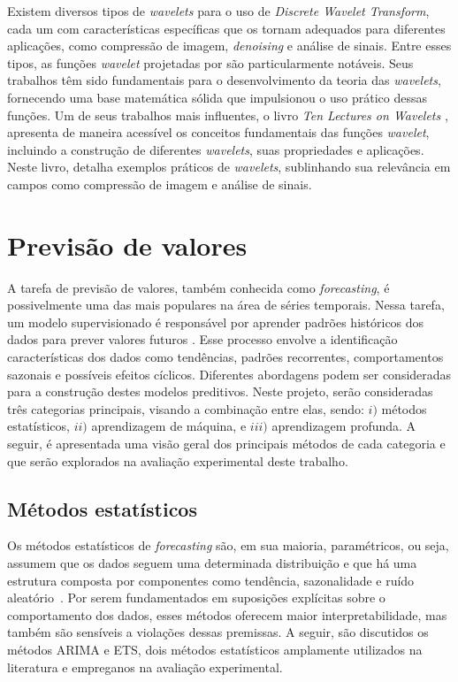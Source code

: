 Existem diversos tipos de \textit{wavelets} para o uso de \textit{Discrete Wavelet Transform}, cada um com características específicas que os tornam adequados para diferentes aplicações, como compressão de imagem, \textit{denoising} e análise de sinais. Entre esses tipos, as funções \textit{wavelet} projetadas por \citeauthor{daubechies1992ten} são particularmente notáveis. Seus trabalhos têm sido fundamentais para o desenvolvimento da teoria das \textit{wavelets}, fornecendo uma base matemática sólida que impulsionou o uso prático dessas funções. Um de seus trabalhos mais influentes, o livro \textit{Ten Lectures on Wavelets} \cite{daubechies1992ten}, apresenta de maneira acessível os conceitos fundamentais das funções \textit{wavelet}, incluindo a construção de diferentes \textit{wavelets}, suas propriedades e aplicações. Neste livro, \citeauthor{daubechies1992ten} detalha exemplos práticos de \textit{wavelets}, sublinhando sua relevância em campos como compressão de imagem e análise de sinais.


\section{Previsão de valores}
A tarefa de previsão de valores, também conhecida como \textit{forecasting}, é possivelmente uma das mais populares na área de séries temporais. Nessa tarefa, um modelo supervisionado é responsável por aprender padrões históricos dos dados para prever valores futuros \citep{parmezan2019evaluation}. Esse processo envolve a identificação características dos dados como tendências, padrões recorrentes, comportamentos sazonais e possíveis efeitos cíclicos. Diferentes abordagens podem ser consideradas para a construção destes modelos preditivos. Neste projeto, serão consideradas três categorias principais, visando a combinação entre elas, sendo: $i)$ métodos estatísticos, $ii)$ aprendizagem de máquina, e $iii)$ aprendizagem profunda. A seguir, é apresentada uma visão geral dos principais métodos de cada categoria e que serão explorados na avaliação experimental deste trabalho.

\subsection{Métodos estatísticos}
Os métodos estatísticos de \textit{forecasting} são, em sua maioria, paramétricos, ou seja, assumem que os dados seguem uma determinada distribuição e que há uma estrutura composta por componentes como tendência, sazonalidade e ruído aleatório~\citep{parmezan2019evaluation}. Por serem fundamentados em suposições explícitas sobre o comportamento dos dados, esses métodos oferecem maior interpretabilidade, mas também são sensíveis a violações dessas premissas. A seguir, são discutidos os métodos ARIMA e ETS, dois métodos estatísticos amplamente utilizados na literatura e empreganos na avaliação experimental.

